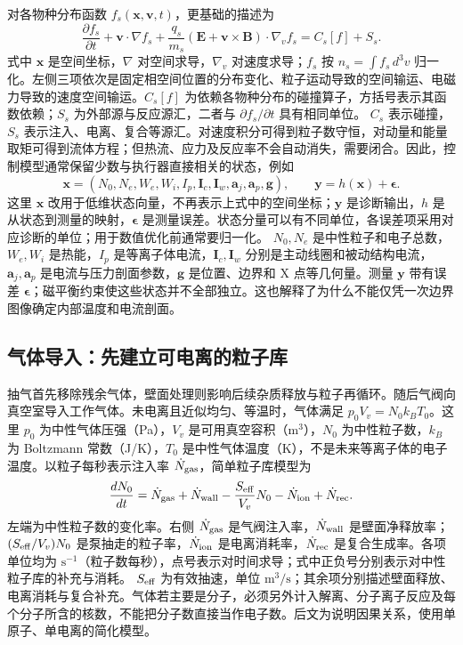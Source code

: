 \documentclass[12pt,fontset=none]{ctexart}
\numberwithin{equation}{section}
\numberwithin{table}{section}
\numberwithin{figure}{section}
\begin{document}
对各物种分布函数 $f_s(\bm x,\bm v,t)$，更基础的描述为
\begin{equation}\label{eq:cycle-kinetic}
 \frac{\partial f_s}{\partial t}+\bm v\cdot\nabla f_s+
 \frac{q_s}{m_s}(\bm E+\bm v\times\bm B)\cdot\nabla_v f_s
 =C_s[f]+S_s.
\end{equation}
式中 $\bm x$ 是空间坐标，$\nabla$ 对空间求导，$\nabla_v$ 对速度求导；$f_s$ 按 $n_s=\int f_s\,d^3v$ 归一化。左侧三项依次是固定相空间位置的分布变化、粒子运动导致的空间输运、电磁力导致的速度空间输运。$C_s[f]$ 为依赖各物种分布的碰撞算子，方括号表示其函数依赖；$S_s$ 为外部源与反应源汇，二者与 $\partial f_s/\partial t$ 具有相同单位。
$C_s$ 表示碰撞，$S_s$ 表示注入、电离、复合等源汇。对速度积分可得到粒子数守恒，对动量和能量取矩可得到流体方程；但热流、应力及反应率不会自动消失，需要闭合。因此，控制模型通常保留少数与执行器直接相关的状态，例如
\begin{equation}\label{eq:cycle-state}
 \bm x=(N_0,N_e,W_e,W_i,I_p,\bm I_c,\bm I_w,\bm a_j,\bm a_p,\bm g),
 \qquad \bm y=h(\bm x)+\bm\epsilon.
\end{equation}
这里 $\bm x$ 改用于低维状态向量，不再表示上式中的空间坐标；$\bm y$ 是诊断输出，$h$ 是从状态到测量的映射，$\bm\epsilon$ 是测量误差。状态分量可以有不同单位，各误差项采用对应诊断的单位；用于数值优化前通常要归一化。
$N_0,N_e$ 是中性粒子和电子总数，$W_e,W_i$ 是热能，$I_p$ 是等离子体电流，$\bm I_c,\bm I_w$ 分别是主动线圈和被动结构电流，$\bm a_j,\bm a_p$ 是电流与压力剖面参数，$\bm g$ 是位置、边界和 X 点等几何量。测量 $\bm y$ 带有误差 $\bm\epsilon$；磁平衡约束使这些状态并不全部独立。这也解释了为什么不能仅凭一次边界图像确定内部温度和电流剖面。

\subsection{气体导入：先建立可电离的粒子库}\label{sec:cycle-gas}

抽气首先移除残余气体，壁面处理则影响后续杂质释放与粒子再循环。随后气阀向真空室导入工作气体。未电离且近似均匀、等温时，气体满足 $p_0V_v=N_0k_BT_0$。这里 $p_0$ 为中性气体压强（Pa），$V_v$ 是可用真空容积（$\mathrm{m^3}$），$N_0$ 为中性粒子数，$k_B$ 为 Boltzmann 常数（J/K），$T_0$ 是中性气体温度（K），不是未来等离子体的电子温度。以粒子每秒表示注入率 $\dot N_{\rm gas}$，简单粒子库模型为
\begin{equation}\label{eq:cycle-gas}
 \frac{dN_0}{dt}=\dot N_{\rm gas}+\dot N_{\rm wall}
 -\frac{S_{\rm eff}}{V_v}N_0-\dot N_{\rm ion}+\dot N_{\rm rec}.
\end{equation}
左端为中性粒子数的变化率。右侧 $\dot N_{\rm gas}$ 是气阀注入率，$\dot N_{\rm wall}$ 是壁面净释放率；$(S_{\rm eff}/V_v)N_0$ 是泵抽走的粒子率，$\dot N_{\rm ion}$ 是电离消耗率，$\dot N_{\rm rec}$ 是复合生成率。各项单位均为 $\mathrm{s^{-1}}$（粒子数每秒），点号表示对时间求导；式中正负号分别表示对中性粒子库的补充与消耗。
$S_{\rm eff}$ 为有效抽速，单位 $\mathrm{m^3/s}$；其余项分别描述壁面释放、电离消耗与复合补充。气体若主要是分子，必须另外计入解离、分子离子反应及每个分子所含的核数，不能把分子数直接当作电子数。后文为说明因果关系，使用单原子、单电离的简化模型。
\end{document}
